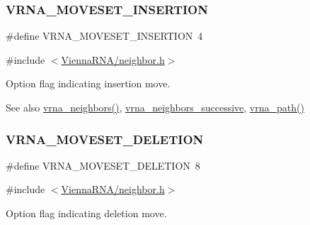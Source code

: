 \subsubsection{\texorpdfstring{V\+R\+N\+A\+\_\+\+M\+O\+V\+E\+S\+E\+T\+\_\+\+I\+N\+S\+E\+R\+T\+I\+ON}{VRNA\_MOVESET\_INSERTION}}
{\footnotesize\ttfamily \#define V\+R\+N\+A\+\_\+\+M\+O\+V\+E\+S\+E\+T\+\_\+\+I\+N\+S\+E\+R\+T\+I\+ON~4}



{\ttfamily \#include $<$\hyperlink{neighbor_8h}{Vienna\+R\+N\+A/neighbor.\+h}$>$}



Option flag indicating insertion move. 

\begin{DoxySeeAlso}{See also}
\hyperlink{group__neighbors_gab1473d856b15da2120fe648977798ad5}{vrna\+\_\+neighbors()}, \hyperlink{group__neighbors_gae5aaa1c5a1f22e889843f3edbdd04714}{vrna\+\_\+neighbors\+\_\+successive}, \hyperlink{group__paths_gab6aee4143f8b103518d5cbfe6bfe5eae}{vrna\+\_\+path()} 
\end{DoxySeeAlso}
\mbox{\label{group__neighbors_gac05db9392c6647e3e9a6982096c5b384}} 
\subsubsection{\texorpdfstring{V\+R\+N\+A\+\_\+\+M\+O\+V\+E\+S\+E\+T\+\_\+\+D\+E\+L\+E\+T\+I\+ON}{VRNA\_MOVESET\_DELETION}}
{\footnotesize\ttfamily \#define V\+R\+N\+A\+\_\+\+M\+O\+V\+E\+S\+E\+T\+\_\+\+D\+E\+L\+E\+T\+I\+ON~8}



{\ttfamily \#include $<$\hyperlink{neighbor_8h}{Vienna\+R\+N\+A/neighbor.\+h}$>$}



Option flag indicating deletion move. 

